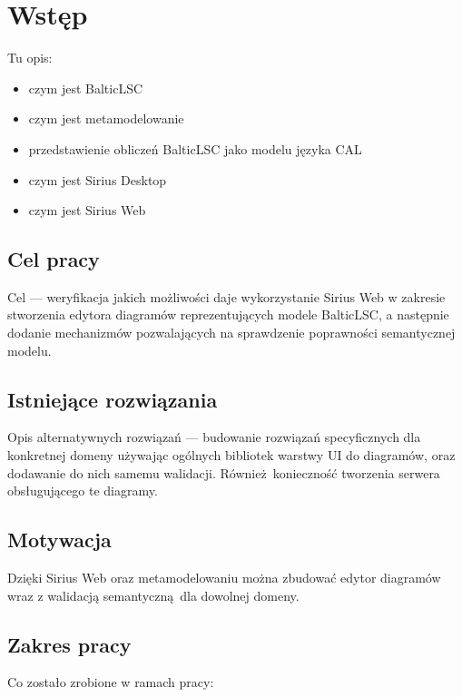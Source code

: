 \chapter{Wstęp}

Tu opis:

\begin{itemize}
	\item czym jest BalticLSC
	\item czym jest metamodelowanie
	\item przedstawienie obliczeń BalticLSC jako modelu języka CAL
	\item czym jest Sirius Desktop
	\item czym jest Sirius Web
\end{itemize}

\section{Cel pracy}

Cel --- weryfikacja jakich możliwości daje wykorzystanie Sirius Web w zakresie
stworzenia edytora diagramów reprezentujących modele BalticLSC, a następnie
dodanie mechanizmów pozwalających na sprawdzenie poprawności semantycznej
modelu.

\section{Istniejące rozwiązania}

Opis alternatywnych rozwiązań --- budowanie rozwiązań specyficznych dla
konkretnej domeny używając ogólnych bibliotek warstwy UI do diagramów, oraz
dodawanie do nich samemu walidacji. Również konieczność tworzenia serwera
obsługującego te diagramy.

\section{Motywacja}

Dzięki Sirius Web oraz metamodelowaniu można zbudować edytor diagramów wraz z
walidacją semantyczną dla dowolnej domeny.

\section{Zakres pracy}

Co zostało zrobione w ramach pracy:

